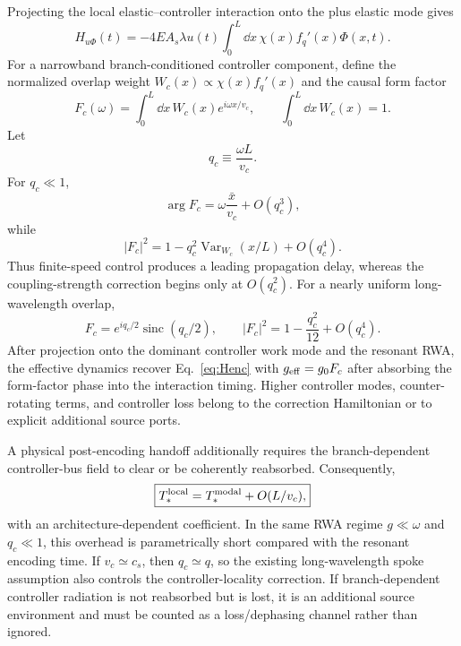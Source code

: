 Projecting the local elastic--controller interaction onto the plus elastic mode gives
\begin{equation}
H_{u\Phi}(t)
=-4E A_s\lambda u(t)
\int_0^L\dd x\,
\chi(x)f_q'(x)\Phi(x,t).
\label{eq:uphi}
\end{equation}
For a narrowband branch-conditioned controller component, define the normalized overlap weight $W_c(x)\propto\chi(x)f_q'(x)$ and the causal form factor
\begin{equation}
\boxed{
F_c(\omega)=
\int_0^L\dd x\,W_c(x)e^{i\omega x/v_c},
\qquad
\int_0^L\dd x\,W_c(x)=1.}
\label{eq:Fc}
\end{equation}
Let
\begin{equation}
q_c\equiv\frac{\omega L}{v_c}.
\end{equation}
For $q_c\ll1$,
\begin{equation}
\boxed{
\arg F_c
=\omega\frac{\bar x}{v_c}+O(q_c^3),}
\end{equation}
while
\begin{equation}
\boxed{
|F_c|^2
=1-q_c^2\operatorname{Var}_{W_c}(x/L)+O(q_c^4).}
\label{eq:Fcsmall}
\end{equation}
Thus finite-speed control produces a leading propagation delay, whereas the coupling-strength correction begins only at $O(q_c^2)$. For a nearly uniform long-wavelength overlap,
\begin{equation}
F_c=e^{iq_c/2}\operatorname{sinc}(q_c/2),
\qquad
|F_c|^2=1-\frac{q_c^2}{12}+O(q_c^4).
\end{equation}
After projection onto the dominant controller work mode and the resonant RWA, the effective dynamics recover Eq.~\eqref{eq:Henc} with $g_{\rm eff}=g_0F_c$ after absorbing the form-factor phase into the interaction timing. Higher controller modes, counter-rotating terms, and controller loss belong to the correction Hamiltonian or to explicit additional source ports.

A physical post-encoding handoff additionally requires the branch-dependent controller-bus field to clear or be coherently reabsorbed. Consequently,
\begin{equation}
\boxed{
T_*^{\rm local}=T_*^{\rm modal}+O(L/v_c),}
\label{eq:Tlocal}
\end{equation}
with an architecture-dependent coefficient. In the same RWA regime $g\ll\omega$ and $q_c\ll1$, this overhead is parametrically short compared with the resonant encoding time. If $v_c\simeq c_s$, then $q_c\simeq q$, so the existing long-wavelength spoke assumption also controls the controller-locality correction. If branch-dependent controller radiation is not reabsorbed but is lost, it is an additional source environment and must be counted as a loss/dephasing channel rather than ignored.

